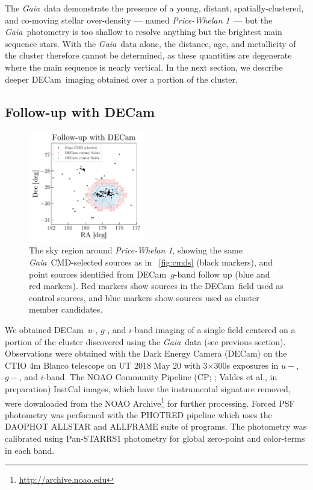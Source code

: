 \documentclass[twocolumn]{aastex62}
\newcommand{\gaia}{\textsl{Gaia}}
\newcommand{\decam}{DECam}
\newcommand{\todo}[1]{{\color{red} TODO: #1}}
\newcommand{\clustername}{\textsl{Price-Whelan 1}}
\begin{document}
The \gaia\ data demonstrate the presence of a young, distant, spatially-clustered, and co-moving stellar over-density --- named \clustername\ --- but the \gaia\ photometry is too shallow to resolve anything but the brightest main sequence stars.
With the \gaia\ data alone, the distance, age, and metallicity of the cluster therefore cannot be determined, as these quantities are degenerate where the main sequence is nearly vertical.
In the next section, we describe deeper \decam\ imaging obtained over a portion of the cluster.

\clearpage

\subsection{Follow-up with \decam}
\label{sec:decam}

\begin{figure}[t!]
\centering
\includegraphics[width=0.45\textwidth]{figures/DECam-field.pdf}
\caption{The sky region around \clustername, showing the same \gaia\ CMD-selected sources as in \figurename~\ref{fig:cmds} (black markers), and point sources identified from \decam\ $g$-band follow up (blue and red markers).
Red markers show sources in the \decam\ field used as control sources, and blue markers show sources used as cluster member candidates.}
\label{fig:decam-field}
\end{figure}

We obtained \decam\ $u$-, $g$-, and $i$-band imaging of a single field centered on a portion of the cluster discovered using the \gaia\ data (see previous section).  Observations were obtained with the Dark Energy Camera (DECam) on the CTIO 4m Blanco telescope on UT 2018 May 20 with 3$\times$300s
exposures in $u-$, $g-$, and $i$-band.  The NOAO Community Pipeline (CP; \citealt{Valdes:2014}; Valdes et al., in preparation) InstCal images, which have the instrumental signature removed, were downloaded from the NOAO Archive\footnote{\url{http://archive.noao.edu}} for further processing.  Forced PSF photometry was performed with the PHOTRED pipeline \citep{Nidever:2017} which uses the DAOPHOT ALLSTAR \citep{Stetson:1987} and ALLFRAME \citep{Stetson:1994} suite of programs.  The photometry was calibrated using Pan-STARRS1 \citep[PS1;][]{Chambers:2016} photometry for
global zero-point and color-terms in each band.
\end{document}
